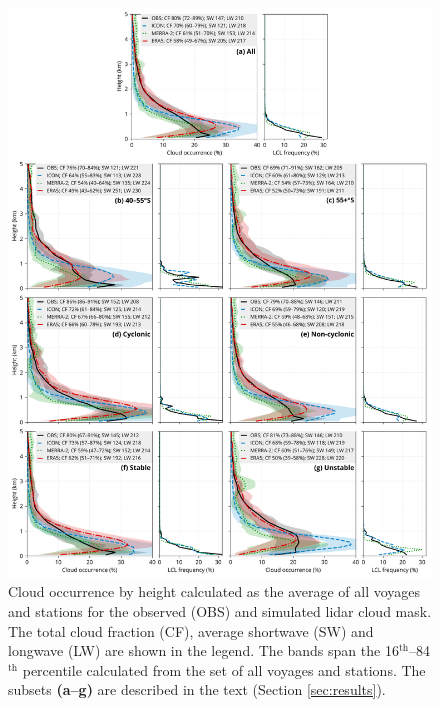 \documentclass[12pt,a4paper]{article}
\begin{document}
\begin{figure}
\centering
\includegraphics[width=\textwidth]{img/cl_agg.pdf}
\caption{
Cloud occurrence by height calculated as the average of all voyages and stations
for the observed (OBS) and simulated lidar cloud mask. The total cloud fraction
(CF), average shortwave (SW) and longwave (LW) are shown in the legend. The
bands span the 16$^\mathrm{th}$--84$^\mathrm{th}$ percentile calculated from
the set of all voyages and stations. The subsets \textbf{(a--g)} are described
in the text (Section \ref{sec:results}).}
\label{fig:cloud-occurrence}
\end{figure}
\end{document}

